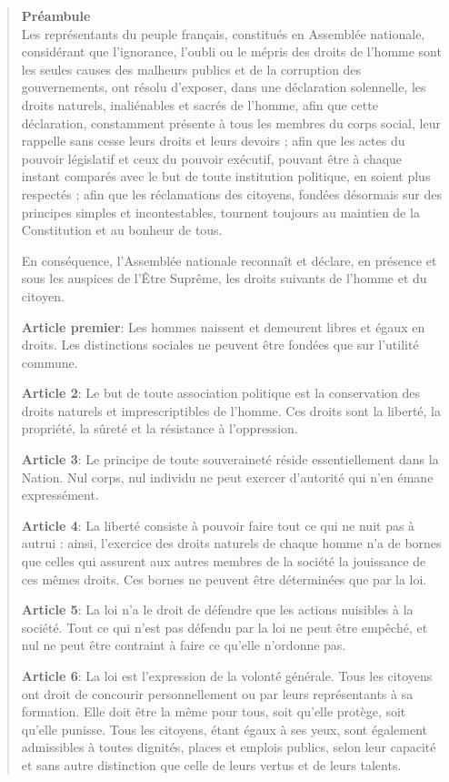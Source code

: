 \documentclass[
  french,
  letterpaper,
  DIV=11,
  numbers=noendperiod]{scrartcl}
\begin{document}
\begin{quote}
\textbf{Préambule}\\
Les représentants du peuple français, constitués en Assemblée nationale,
considérant que l'ignorance, l'oubli ou le mépris des droits de l'homme
sont les seules causes des malheurs publics et de la corruption des
gouvernements, ont résolu d'exposer, dans une déclaration solennelle,
les droits naturels, inaliénables et sacrés de l'homme, afin que cette
déclaration, constamment présente à tous les membres du corps social,
leur rappelle sans cesse leurs droits et leurs devoirs ; afin que les
actes du pouvoir législatif et ceux du pouvoir exécutif, pouvant être à
chaque instant comparés avec le but de toute institution politique, en
soient plus respectés ; afin que les réclamations des citoyens, fondées
désormais sur des principes simples et incontestables, tournent toujours
au maintien de la Constitution et au bonheur de tous.

En conséquence, l'Assemblée nationale reconnaît et déclare, en présence
et sous les auspices de l'Être Suprême, les droits suivants de l'homme
et du citoyen.

\textbf{Article premier}: Les hommes naissent et demeurent libres et
égaux en droits. Les distinctions sociales ne peuvent être fondées que
sur l'utilité commune.

\textbf{Article 2}: Le but de toute association politique est la
conservation des droits naturels et imprescriptibles de l'homme. Ces
droits sont la liberté, la propriété, la sûreté et la résistance à
l'oppression.

\textbf{Article 3}: Le principe de toute souveraineté réside
essentiellement dans la Nation. Nul corps, nul individu ne peut exercer
d'autorité qui n'en émane expressément.

\textbf{Article 4}: La liberté consiste à pouvoir faire tout ce qui ne
nuit pas à autrui : ainsi, l'exercice des droits naturels de chaque
homme n'a de bornes que celles qui assurent aux autres membres de la
société la jouissance de ces mêmes droits. Ces bornes ne peuvent être
déterminées que par la loi.

\textbf{Article 5}: La loi n'a le droit de défendre que les actions
nuisibles à la société. Tout ce qui n'est pas défendu par la loi ne peut
être empêché, et nul ne peut être contraint à faire ce qu'elle n'ordonne
pas.

\textbf{Article 6}: La loi est l'expression de la volonté générale. Tous
les citoyens ont droit de concourir personnellement ou par leurs
représentants à sa formation. Elle doit être la même pour tous, soit
qu'elle protège, soit qu'elle punisse. Tous les citoyens, étant égaux à
ses yeux, sont également admissibles à toutes dignités, places et
emplois publics, selon leur capacité et sans autre distinction que celle
de leurs vertus et de leurs talents.


\end{quote}
\end{document}
